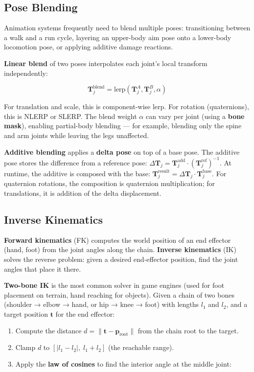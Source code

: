 \documentclass[
  11pt,
  letterpaper,
  DIV=11,
  numbers=noendperiod,
  twoside,
  open=right]{scrreprt}
\providecommand{\tightlist}{%
  \setlength{\itemsep}{0pt}\setlength{\parskip}{0pt}}
\begin{document}
\subsection{Pose Blending}\label{pose-blending}

Animation systems frequently need to blend multiple poses: transitioning
between a walk and a run cycle, layering an upper-body aim pose onto a
lower-body locomotion pose, or applying additive damage reactions.

\textbf{Linear blend} of two poses interpolates each joint's local
transform independently:

\[
\mathbf{T}_j^{\text{blend}} = \text{lerp}(\mathbf{T}_j^{A}, \mathbf{T}_j^{B}, \alpha)
\]

For translation and scale, this is component-wise lerp. For rotation
(quaternions), this is NLERP or SLERP. The blend weight \(\alpha\) can
vary per joint (using a \textbf{bone mask}), enabling partial-body
blending --- for example, blending only the spine and arm joints while
leaving the legs unaffected.

\textbf{Additive blending} applies a \textbf{delta pose} on top of a
base pose. The additive pose stores the difference from a reference
pose:
\(\Delta\mathbf{T}_j = \mathbf{T}_j^{\text{add}} \cdot (\mathbf{T}_j^{\text{ref}})^{-1}\).
At runtime, the additive is composed with the base:
\(\mathbf{T}_j^{\text{result}} = \Delta\mathbf{T}_j \cdot \mathbf{T}_j^{\text{base}}\).
For quaternion rotations, the composition is quaternion multiplication;
for translations, it is addition of the delta displacement.

\subsection{Inverse Kinematics}\label{inverse-kinematics}

\textbf{Forward kinematics} (FK) computes the world position of an end
effector (hand, foot) from the joint angles along the chain.
\textbf{Inverse kinematics} (IK) solves the reverse problem: given a
desired end-effector position, find the joint angles that place it
there.

\textbf{Two-bone IK} is the most common solver in game engines (used for
foot placement on terrain, hand reaching for objects). Given a chain of
two bones (shoulder → elbow → hand, or hip → knee → foot) with lengths
\(l_1\) and \(l_2\), and a target position \(\mathbf{t}\) for the end
effector:

\begin{enumerate}
\def\labelenumi{\arabic{enumi}.}
\tightlist
\item
  Compute the distance \(d = \|\mathbf{t} - \mathbf{p}_{\text{root}}\|\)
  from the chain root to the target.
\item
  Clamp \(d\) to \([|l_1 - l_2|, \; l_1 + l_2]\) (the reachable range).
\item
  Apply the \textbf{law of cosines} to find the interior angle at the
  middle joint:
\end{enumerate}
\end{document}
